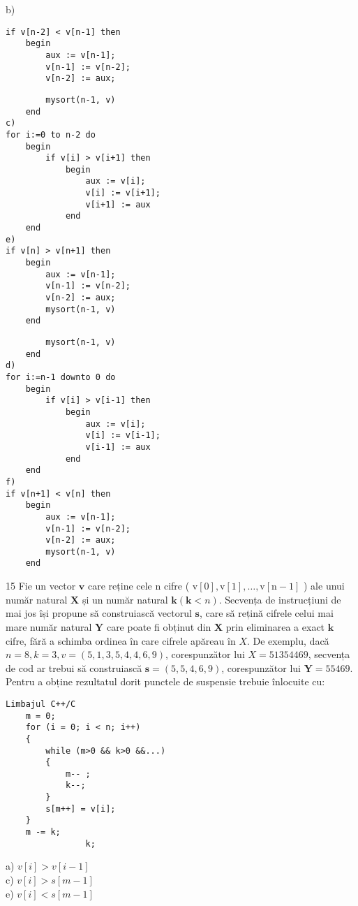 b)

\begin{verbatim}
if v[n-2] < v[n-1] then
    begin
        aux := v[n-1];
        v[n-1] := v[n-2];
        v[n-2] := aux;
\end{verbatim}

\begin{verbatim}
        mysort(n-1, v)
    end
c)
for i:=0 to n-2 do
    begin
        if v[i] > v[i+1] then
            begin
                aux := v[i];
                v[i] := v[i+1];
                v[i+1] := aux
            end
    end
e)
if v[n] > v[n+1] then
    begin
        aux := v[n-1];
        v[n-1] := v[n-2];
        v[n-2] := aux;
        mysort(n-1, v)
    end
\end{verbatim}

\begin{verbatim}
        mysort(n-1, v)
    end
d)
for i:=n-1 downto 0 do
    begin
        if v[i] > v[i-1] then
            begin
                aux := v[i];
                v[i] := v[i-1];
                v[i-1] := aux
            end
    end
f)
if v[n+1] < v[n] then
    begin
        aux := v[n-1];
        v[n-1] := v[n-2];
        v[n-2] := aux;
        mysort(n-1, v)
    end
\end{verbatim}

15 Fie un vector $\mathbf{v}$ care reține cele n cifre ( $\mathrm{v}[0], \mathrm{v}[1], \ldots, \mathrm{v}[\mathrm{n}-1]$ ) ale unui număr natural $\mathbf{X}$ și un număr natural $\mathbf{k}(\mathbf{k}<n)$. Secvența de instrucțiuni de mai jos își propune să construiască vectorul $\mathbf{s}$, care să rețină cifrele celui mai mare număr natural $\mathbf{Y}$ care poate fi obținut din $\mathbf{X}$ prin eliminarea a exact $\mathbf{k}$ cifre, fără a schimba ordinea în care cifrele apăreau în $X$. De exemplu, dacă $n=8, k=3, v=(5,1,3,5,4,4,6,9)$, corespunzător lui $X=51354469$, secvența de cod ar trebui să construiască $\mathbf{s}=(5,5,4,6,9)$, corespunzător lui $\mathbf{Y}=55469$. Pentru a obține rezultatul dorit punctele de suspensie trebuie înlocuite cu:

\begin{verbatim}
Limbajul C++/C
    m = 0;
    for (i = 0; i < n; i++)
    {
        while (m>0 && k>0 &&...)
        {
            m-- ;
            k--;
        }
        s[m++] = v[i];
    }
    m -= k;
                k;
\end{verbatim}

a) $v[i]>v[i-1]$\\
c) $v[i]>s[m-1]$\\
e) $v[i]<s[m-1]$

